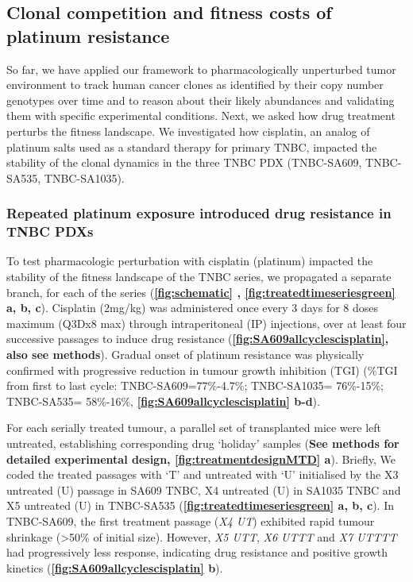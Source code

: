 \subsection{Clonal competition and fitness costs of platinum resistance}
So far, we have applied our framework to pharmacologically unperturbed tumor environment to track human cancer clones as identified by their copy number genotypes over time and to reason about their likely abundances and validating them with specific experimental conditions. Next, we asked how drug treatment perturbs the fitness landscape. We investigated how cisplatin, an analog of platinum salts used as a standard therapy for primary TNBC, impacted the stability of the clonal dynamics in the three TNBC PDX (TNBC-SA609, TNBC-SA535, TNBC-SA1035).


\subsubsection{Repeated platinum exposure introduced drug resistance in TNBC PDXs} 
 To test pharmacologic perturbation with cisplatin (platinum) impacted the stability of the fitness landscape of the TNBC series, we propagated a separate branch, for each of the series (\textbf{\autoref{fig:schematic} , \autoref{fig:treatedtimeseriesgreen} a, b, c}). Cisplatin (2mg/kg) was administered once every 3 days for 8 doses maximum (Q3Dx8 max) through intraperitoneal (IP) injections, over at least four successive passages to induce drug resistance  (\textbf{\autoref{fig:SA609allcyclescisplatin}, also see methods}). Gradual onset of platinum resistance was physically confirmed with progressive reduction in tumour growth inhibition (TGI) \cite{hather2014growth} (\%TGI from first to last cycle: TNBC-SA609=77\%-4.7\%; TNBC-SA1035= 76\%-15\%; TNBC-SA535= 58\%-16\%, \textbf{\autoref{fig:SA609allcyclescisplatin} b-d}).
 
 For each serially treated tumour, a parallel set of transplanted mice were left untreated, establishing corresponding drug `holiday' samples (\textbf{See methods for detailed experimental design, \textbf{\autoref{fig:treatmentdesignMTD} a}}). Briefly, We coded the treated passages with `T' and untreated with `U' initialised by the X3 untreated (U) passage in SA609 TNBC, X4 untreated (U) in SA1035 TNBC and X5 untreated (U) in  TNBC-SA535 (\textbf{\autoref{fig:treatedtimeseriesgreen} a, b, c}). In TNBC-SA609, the first treatment passage (\textit{X4 UT}) exhibited rapid tumour shrinkage (>50\% of initial size). However, \textit{X5 UTT}, \textit{X6 UTTT} and \textit{X7 UTTTT} had progressively less response, indicating drug resistance and positive growth kinetics (\textbf{\autoref{fig:SA609allcyclescisplatin} b}).


